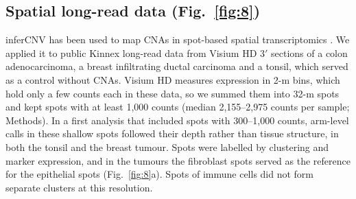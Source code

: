 \subsection{Spatial long-read data (Fig.~\ref{fig:8})}

inferCNV has been used to map CNAs in spot-based spatial transcriptomics \citep{erickson2022, wu2021liver}. We applied it to public Kinnex long-read data from Visium HD 3$'$ \citep{pacbio2026visiumhd} sections of a colon adenocarcinoma, a breast infiltrating ductal carcinoma and a tonsil, which served as a control without CNAs. Visium HD measures expression in 2-\textmu m bins, which hold only a few counts each in these data, so we summed them into 32-\textmu m spots and kept spots with at least 1,000 counts (median 2,155--2,975 counts per sample; Methods). In a first analysis that included spots with 300--1,000 counts, arm-level calls in these shallow spots followed their depth rather than tissue structure, in both the tonsil and the breast tumour. Spots were labelled by clustering and marker expression, and in the tumours the fibroblast spots served as the reference for the epithelial spots (Fig.~\ref{fig:8}a). Spots of immune cells did not form separate clusters at this resolution.


